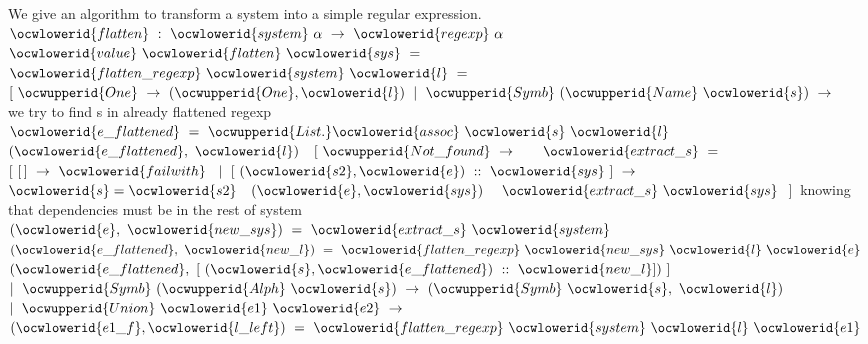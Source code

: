\documentclass[12pt]{article}
\begin{document}
\ocwendcode{}\ocwindent{0.00em}
We give an algorithm to transform a system into a simple regular expression. 
\ocweol
\ocwindent{0.00em}
\ocwbegindcode{}$\ocwlowerid{flatten}~:~\ocwlowerid{system}~\alpha{}~\rightarrow{}~\ocwlowerid{regexp}~\alpha{}$\ocwenddcode{} 
\ocweol
\label{../ML/regular.ml:13719}%
\medskip
\ocwbegincode{}\ocwindent{0.00em}
$\ocwlowerid{value}~\ocwlowerid{flatten}~\ocwlowerid{sys}~=~$\ocweol
\ocwindent{1.00em}
~~$\ocwlowerid{flatten\_regexp}~\ocwlowerid{system}~\ocwlowerid{l}~=~$\ocweol
\ocwindent{2.00em}
$[~\ocwupperid{One}~\rightarrow{}~(\ocwupperid{One},\ocwlowerid{l})$\ocweol
\ocwindent{2.00em}
$\mid{}~\ocwupperid{Symb}~(\ocwupperid{Name}~\ocwlowerid{s})~\rightarrow{}~$\ocweol
\ocwindent{3.00em}
~\ocwbc{} we try to find s in already flattened regexp \ocwec{}\ocweol
\ocwindent{4.00em}
~$\ocwlowerid{e\_flattened}~=~\ocwupperid{List.}\ocwlowerid{assoc}~\ocwlowerid{s}~\ocwlowerid{l}~$~\ocweol
\ocwindent{4.00em}
$(\ocwlowerid{e\_flattened},~\ocwlowerid{l})$\ocweol
\ocwindent{3.00em}
~$[~\ocwupperid{Not\_found}~\rightarrow{}~$\ocweol
\ocwindent{6.50em}
~~$\ocwlowerid{extract\_s}~=~$~\ocweol
\ocwindent{8.50em}
$[~[\,]~\rightarrow{}~\ocwlowerid{failwith}~$\ocweol
\ocwindent{8.50em}
$\mid{}~[~(\ocwlowerid{s2},\ocwlowerid{e})~::~\ocwlowerid{sys}~]~\rightarrow{}~$~$\ocwlowerid{s}=\ocwlowerid{s2}~$~$(\ocwlowerid{e},\ocwlowerid{sys})~$\ocweol
\ocwindent{20.00em}
~$\ocwlowerid{extract\_s}~\ocwlowerid{sys}~$\ocweol
\ocwindent{8.50em}
$]~$\ocweol
\ocwindent{6.50em}
\ocwbc{} knowing that dependencies must be in the rest of system \ocwec{}\ocweol
\ocwindent{6.50em}
~$(\ocwlowerid{e},~\ocwlowerid{new\_sys})~=~\ocwlowerid{extract\_s}~\ocwlowerid{system}~$\ocweol
\ocwindent{6.50em}
~$(\ocwlowerid{e\_flattened},~\ocwlowerid{new\_l})~=~\ocwlowerid{flatten\_regexp}~\ocwlowerid{new\_sys}~\ocwlowerid{l}~\ocwlowerid{e}~$\ocweol
\ocwindent{6.50em}
$(\ocwlowerid{e\_flattened},~[~(\ocwlowerid{s},\ocwlowerid{e\_flattened})~::~\ocwlowerid{new\_l}])~]$\ocweol
\ocwindent{2.00em}
$\mid{}~\ocwupperid{Symb}~(\ocwupperid{Alph}~\ocwlowerid{s})~\rightarrow{}~(\ocwupperid{Symb}~\ocwlowerid{s},~\ocwlowerid{l})$\ocweol
\ocwindent{2.00em}
$\mid{}~\ocwupperid{Union}~\ocwlowerid{e1}~\ocwlowerid{e2}~\rightarrow{}~$\ocweol
\ocwindent{4.00em}
~$(\ocwlowerid{e1\_f},\ocwlowerid{l\_left})~=~\ocwlowerid{flatten\_regexp}~\ocwlowerid{system}~\ocwlowerid{l}~\ocwlowerid{e1}~$\ocweol
\end{document}
